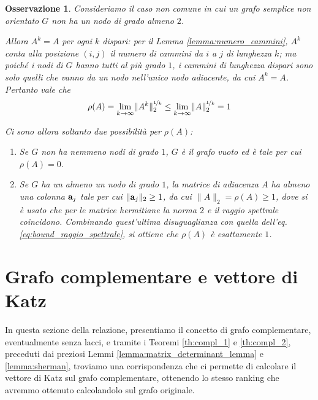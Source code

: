 \documentclass[a4paper]{article}
\newcommand{\avec}{{\bf a}}
\newtheorem{remark}{Osservazione}
\begin{document}
\begin{remark}
    Consideriamo il caso non comune in cui un grafo semplice non orientato $G$ non ha
    un nodo di grado almeno $2$.
    
    Allora $A^k = A$ per ogni $k$ dispari: per il Lemma \ref{lemma:numero_cammini},
    $A^k$ conta alla posizione $(i, j)$ il numero di cammini da $i$ a $j$ di lunghezza $k$; ma poiché
    i nodi di $G$ hanno tutti al più grado $1$, i cammini di lunghezza dispari sono solo quelli che vanno da un
    nodo nell'unico nodo adiacente, da cui $A^k = A$. Pertanto vale che
    \begin{equation}
        \label{eq:bound_raggio_spettrale}
        \rho(A) = \lim_{k \to \infty} \lVert A^k \rVert_2^{\nicefrac{1}{k}} \leq
        \lim_{k \to \infty} \lVert A \rVert_2^{\nicefrac{1}{k}} = 1
    \end{equation}

    Ci sono allora soltanto due possibilità per $\rho(A)$:
    \begin{enumerate}
        \item Se $G$ non ha nemmeno nodi di grado $1$, $G$ è il grafo vuoto ed è tale per cui $\rho(A) = 0$.
        \item Se $G$ ha un almeno un nodo di grado $1$, la matrice di adiacenza $A$ ha almeno una colonna $\avec_j$ tale
            per cui $\lVert \avec_j \rVert_2 \geq 1$, da cui $\lVert A \rVert_2 = \rho(A) \geq 1$, dove si è usato che per le
            matrice hermitiane la norma $2$ e il raggio spettrale coincidono. Combinando quest'ultima disuguaglianza  
            con quella dell'eq. \eqref{eq:bound_raggio_spettrale}, si ottiene che $\rho(A)$ è esattamente $1$.
    \end{enumerate}
\end{remark}

\section{Grafo complementare e vettore di Katz}

In questa sezione della relazione, presentiamo il concetto di grafo
complementare, eventualmente senza lacci, e tramite i Teoremi
\ref{th:compl_1} e \ref{th:compl_2}, preceduti dai preziosi Lemmi
\ref{lemma:matrix_determinant_lemma} e \ref{lemma:sherman},
troviamo una corrispondenza che ci permette di calcolare il vettore di
Katz sul grafo complementare, ottenendo lo stesso ranking che avremmo
ottenuto calcolandolo sul grafo originale.
\end{document}
